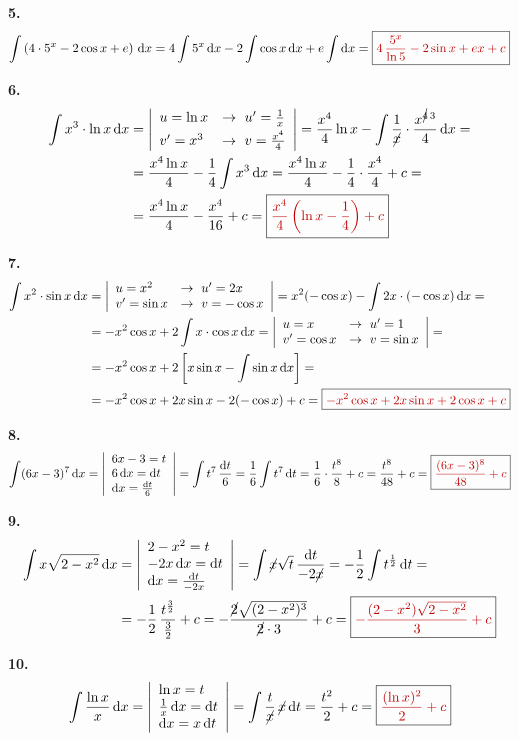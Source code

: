 \documentclass[11pt,a4paper,fleqn]{article}
\newcommand{\vysl}[1]{\boxed{\color{red!75!black}#1}}
\newcommand{\dx}{\,\mathrm{d}x}
\newcommand{\dt}{\,\mathrm{d}t}
\newcommand{\subst}[1]{\left|\begin{array}{l}#1\end{array}\right|}
\begin{document}
\textbf{5.}
\[
\int\left(4\cdot5^x-2\cos x+e\right)\dx = 4\int5^x\dx-2\int\cos x\dx+e\int\mathrm{d}x
= \vysl{4\,\frac{5^x}{\ln5}-2\sin x+ex+c}
\]

\textbf{6.}
\begin{align*}
\int x^3\cdot\ln x\dx &=
\left|\begin{array}{ll} u=\ln x & \to\ u'=\frac1x\\[3pt] v'=x^3 & \to\ v=\frac{x^4}{4}\end{array}\right|
= \frac{x^4}{4}\ln x-\int\frac{1}{\cancel{x}}\cdot\frac{x^{\cancel{4}\,3}}{4}\dx =\\
&= \frac{x^4\ln x}{4}-\frac14\int x^3\dx = \frac{x^4\ln x}{4}-\frac14\cdot\frac{x^4}{4}+c =\\
&= \frac{x^4\ln x}{4}-\frac{x^4}{16}+c = \vysl{\frac{x^4}{4}\left(\ln x-\frac14\right)+c}
\end{align*}

\textbf{7.}
\begin{align*}
\int x^2\cdot\sin x\dx &=
\left|\begin{array}{ll} u=x^2 & \to\ u'=2x\\ v'=\sin x & \to\ v=-\cos x\end{array}\right|
= x^2(-\cos x)-\int2x\cdot(-\cos x)\dx =\\
&= -x^2\cos x+2\int x\cdot\cos x\dx =
\left|\begin{array}{ll} u=x & \to\ u'=1\\ v'=\cos x & \to\ v=\sin x\end{array}\right| =\\
&= -x^2\cos x+2\left[x\sin x-\int\sin x\dx\right] =\\
&= -x^2\cos x+2x\sin x-2(-\cos x)+c = \vysl{-x^2\cos x+2x\sin x+2\cos x+c}
\end{align*}

\textbf{8.}
\[
\int(6x-3)^7\dx =
\left|\begin{array}{l} 6x-3=t\\ 6\dx=\mathrm{d}t\\ \mathrm{d}x=\frac{\mathrm{d}t}{6}\end{array}\right|
= \int t^7\,\frac{\mathrm{d}t}{6} = \frac16\int t^7\dt = \frac16\cdot\frac{t^8}{8}+c
= \frac{t^8}{48}+c = \vysl{\frac{(6x-3)^8}{48}+c}
\]

\textbf{9.}
\begin{align*}
\int x\sqrt{2-x^2}\dx &=
\subst{2-x^2=t\\ -2x\dx=\mathrm{d}t\\ \mathrm{d}x=\frac{\mathrm{d}t}{-2x}}
= \int \cancel{x}\sqrt{t}\,\frac{\mathrm{d}t}{-2\cancel{x}}
= -\frac12\int t^{\frac12}\dt =\\
&= -\frac12\,\frac{t^{\frac32}}{\frac32}+c
= -\frac{\cancel{2}\sqrt{(2-x^2)^3}}{\cancel{2}\cdot3}+c
= \vysl{-\frac{(2-x^2)\sqrt{2-x^2}}{3}+c}
\end{align*}

\textbf{10.}
\[
\int\frac{\ln x}{x}\dx =
\subst{\ln x=t\\ \frac1x\dx=\mathrm{d}t\\ \mathrm{d}x=x\dt}
= \int\frac{t}{\cancel{x}}\,\cancel{x}\dt = \frac{t^2}{2}+c
= \vysl{\frac{(\ln x)^2}{2}+c}
\]
\end{document}
